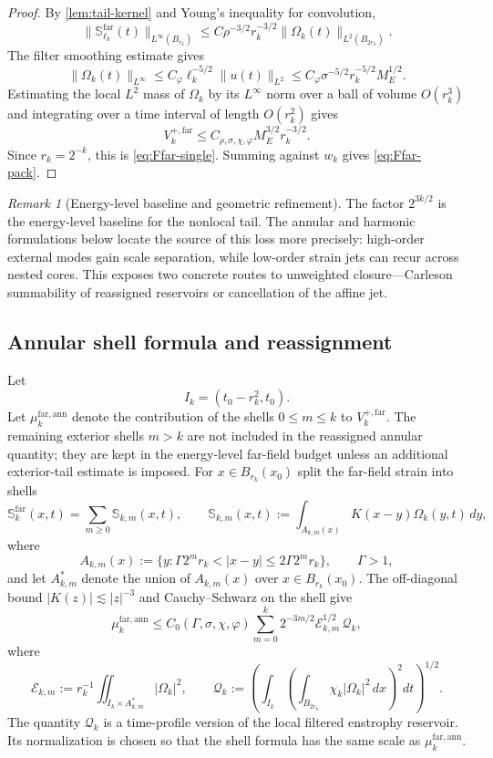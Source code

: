 \documentclass[11pt]{article}
\numberwithin{equation}{section}
\theoremstyle{plain}
\theoremstyle{definition}
\theoremstyle{remark}
\newtheorem{remark}[theorem]{Remark}
\begin{document}
\begin{proof}
By \cref{lem:tail-kernel} and Young's inequality for convolution,
\[
\|\mathbb S_{\ell_k}^{\mathrm{far}}(t)\|_{L^\infty(B_{r_k})}
\le
C\rho^{-3/2}r_k^{-3/2}
\|\Omega_k(t)\|_{L^2(B_{2r_k})}.
\]
The filter smoothing estimate gives
\[
\|\Omega_k(t)\|_{L^\infty}
\le C_\varphi \ell_k^{-5/2}\|u(t)\|_{L^2}
\le C_\varphi \sigma^{-5/2}r_k^{-5/2}M_E^{1/2}.
\]
Estimating the local $L^2$ mass of $\Omega_k$ by its $L^\infty$ norm over a ball of volume $O(r_k^3)$ and integrating over a time interval of length $O(r_k^2)$ gives
\[
V_k^{+,\mathrm{far}}
\le
C_{\rho,\sigma,\chi,\varphi}M_E^{3/2}r_k^{-3/2}.
\]
Since $r_k=2^{-k}$, this is \eqref{eq:Ffar-single}.  Summing against $w_k$ gives \eqref{eq:Ffar-pack}.
\end{proof}

\begin{remark}[Energy-level baseline and geometric refinement]\label{rem:farfield-weight-loss}
The factor $2^{3k/2}$ is the energy-level baseline for the nonlocal tail.  The annular and harmonic formulations below locate the source of this loss more precisely: high-order external modes gain scale separation, while low-order strain jets can recur across nested cores.  This exposes two concrete routes to unweighted closure---Carleson summability of reassigned reservoirs or cancellation of the affine jet.
\end{remark}

\subsection{Annular shell formula and reassignment}

Let
\[
I_k=(t_0-r_k^2,t_0).
\]
Let $\mu_k^{\mathrm{far,ann}}$ denote the contribution of the shells $0\le m\le k$ to $V_k^{+,\mathrm{far}}$.  The remaining exterior shells $m>k$ are not included in the reassigned annular quantity; they are kept in the energy-level far-field budget unless an additional exterior-tail estimate is imposed.
For $x\in B_{r_k}(x_0)$ split the far-field strain into shells
\[
\mathbb S_k^{\mathrm{far}}(x,t)=\sum_{m\ge0}\mathbb S_{k,m}(x,t),
\qquad
\mathbb S_{k,m}(x,t)
:=
\int_{A_{k,m}(x)}K(x-y)\Omega_k(y,t)\,dy,
\]
where
\[
A_{k,m}(x):=\{y:\Gamma 2^m r_k<|x-y|\le 2\Gamma 2^m r_k\},
\qquad \Gamma>1,
\]
and let $A_{k,m}^*$ denote the union of $A_{k,m}(x)$ over $x\in B_{r_k}(x_0)$.  The off-diagonal bound $|K(z)|\lesssim |z|^{-3}$ and Cauchy--Schwarz on the shell give
\begin{equation}\label{eq:far-shell-estimate}
\mu_k^{\mathrm{far,ann}}
\le
C_0(\Gamma,\sigma,\chi,\varphi)
\sum_{m=0}^{k}2^{-3m/2}
\mathcal E_{k,m}^{1/2}\,\mathcal Q_k,
\end{equation}
where
\begin{equation}\label{eq:Ekm-Qk-def}
\mathcal E_{k,m}:=
 r_k^{-1}\iint_{I_k\times A_{k,m}^*}|\Omega_k|^2,
\qquad
\mathcal Q_k:=
\left(
 \int_{I_k}
 \left(\int_{B_{2r_k}}\chi_k|\Omega_k|^2\,dx\right)^2dt
\right)^{1/2}.
\end{equation}
The quantity $\mathcal Q_k$ is a time-profile version of the local filtered enstrophy reservoir.  Its normalization is chosen so that the shell formula has the same scale as $\mu_k^{\mathrm{far,ann}}$.
\end{document}
